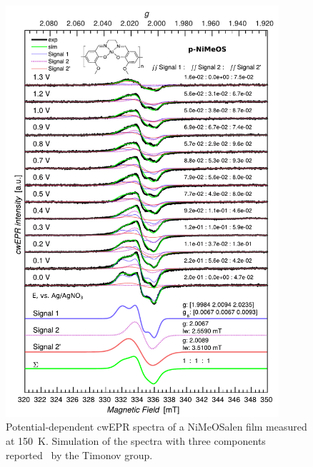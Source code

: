 \begin{figure}[H]
\center
	\includegraphics[width=0.9\textwidth]{./operando_epr/figures/CRYO/Figure_S8.pdf}
	\caption{Potential-dependent cwEPR spectra of a NiMeOSalen film measured at 150~K. Simulation of the spectra with three components reported~\cite{Dmitrieva2018} by the Timonov group.}
	\label{fig:cwEPR_CRYO_NiSalen_REDOX_SIM}
\end{figure}



